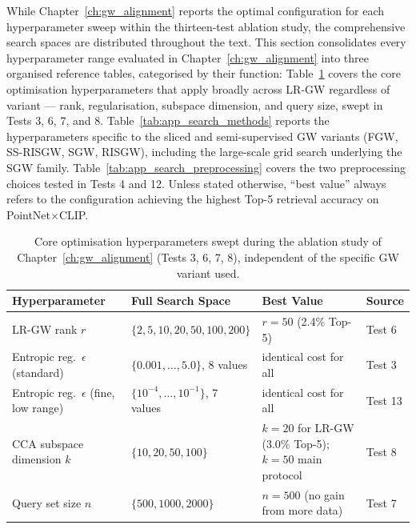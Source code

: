 While Chapter~\ref{ch:gw_alignment} reports the optimal configuration for each hyperparameter sweep within the thirteen-test ablation study, the comprehensive search spaces are distributed throughout the text. This section consolidates every hyperparameter range evaluated in Chapter~\ref{ch:gw_alignment} into three organised reference tables, categorised by their function: Table~\ref{tab:app_search_core} covers the core optimisation hyperparameters that apply broadly across LR-GW regardless of variant --- rank, regularisation, subspace dimension, and query size, swept in Tests 3, 6, 7, and 8. Table~\ref{tab:app_search_methods} reports the hyperparameters specific to the sliced and semi-supervised GW variants (FGW, SS-RISGW, SGW, RISGW), including the large-scale grid search underlying the SGW family. Table~\ref{tab:app_search_preprocessing} covers the two preprocessing choices tested in Tests 4 and 12. Unless stated otherwise, ``best value'' always refers to the configuration achieving the highest Top-5 retrieval accuracy on PointNet$\times$CLIP.

\begin{table}[H]
\centering
\small
\begin{tabularx}{\textwidth}{p{3.0cm}Xp{4.2cm}l}
\toprule
\textbf{Hyperparameter} & \textbf{Full Search Space} & \textbf{Best Value} & \textbf{Source} \\
\midrule
LR-GW rank $r$ & $\{2, 5, 10, 20, 50, 100, 200\}$ & $r{=}50$ (2.4\% Top-5) & Test 6 \\
Entropic reg.\ $\epsilon$ (standard) & $\{0.001, \ldots, 5.0\}$, 8 values & identical cost for all & Test 3 \\
Entropic reg.\ $\epsilon$ (fine, low range) & $\{10^{-4}, \ldots, 10^{-1}\}$, 7 values & identical cost for all & Test 13 \\
CCA subspace dimension $k$ & $\{10, 20, 50, 100\}$ & $k{=}20$ for LR-GW (3.0\% Top-5); $k{=}50$ main protocol & Test 8 \\
Query set size $n$ & $\{500, 1000, 2000\}$ & $n{=}500$ (no gain from more data) & Test 7 \\
\bottomrule
\end{tabularx}
\caption{Core optimisation hyperparameters swept during the ablation study
of Chapter~\ref{ch:gw_alignment} (Tests 3, 6, 7, 8), independent of the
specific GW variant used.}
\label{tab:app_search_core}
\end{table}


